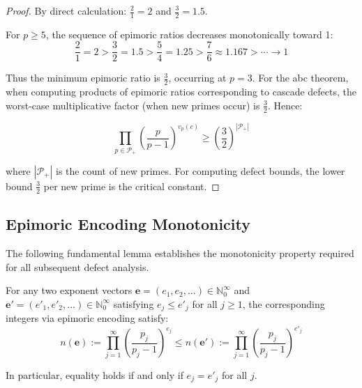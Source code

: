 \begin{proof}

By direct calculation: $\frac{2}{1} = 2$ and $\frac{3}{2} = 1.5$.

For $p \geq 5$, the sequence of epimoric ratios decreases monotonically toward 1:
\begin{equation}
\frac{2}{1} = 2 > \frac{3}{2} = 1.5 > \frac{5}{4} = 1.25 > \frac{7}{6} \approx 1.167 > \cdots \to 1
\end{equation}

Thus the minimum epimoric ratio is $\frac{3}{2}$, occurring at $p = 3$. For the abc theorem, when computing products of epimoric ratios corresponding to cascade defects, the worst-case multiplicative factor (when new primes occur) is $\frac{3}{2}$. Hence:

\begin{equation}
\prod_{p \in \mathcal{P}_+} \left(\frac{p}{p-1}\right)^{v_p(c)} \geq \left(\frac{3}{2}\right)^{|\mathcal{P}_+|}
\end{equation}

where $|\mathcal{P}_+|$ is the count of new primes. For computing defect bounds, the lower bound $\frac{3}{2}$ per new prime is the critical constant.

\end{proof}

\subsection{Epimoric Encoding Monotonicity}
\label{subsec:epimoric-monotonicity}

The following fundamental lemma establishes the monotonicity property required for all subsequent defect analysis.

\begin{lemma}
\label{lem:epimoric-monotonicity}

For any two exponent vectors $\mathbf{e} = (e_1, e_2, \ldots) \in \mathbb{N}_0^{\infty}$ and $\mathbf{e}' = (e'_1, e'_2, \ldots) \in \mathbb{N}_0^{\infty}$ satisfying $e_j \leq e'_j$ for all $j \geq 1$, the corresponding integers via epimoric encoding satisfy:
\begin{equation}
n(\mathbf{e}) := \prod_{j=1}^{\infty} \left(\frac{p_j}{p_j-1}\right)^{e_j} \leq n(\mathbf{e}') := \prod_{j=1}^{\infty} \left(\frac{p_j}{p_j-1}\right)^{e'_j}
\end{equation}

In particular, equality holds if and only if $e_j = e'_j$ for all $j$.

\end{lemma}

